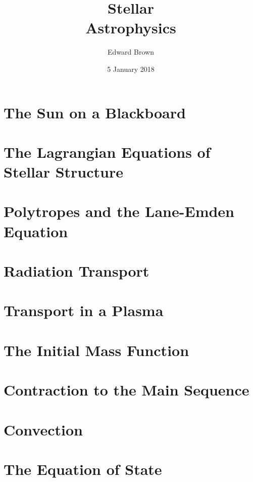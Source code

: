 \documentclass{astro-bookshelf}
\title{Stellar\\Astrophysics}
\author{Edward Brown}
\date{5 January 2018}
\begin{document}
\frontmatter
{}


\mainmatter
{}
\setcounter{page}{1}

\chapter{The Sun on a Blackboard}\label{ch.introduction}


\chapter[Equations of Stellar Structure]{The Lagrangian Equations of Stellar Structure}\label{ch.stellar-structure-eqn}


\chapter[Polytropes]{Polytropes and the Lane-Emden Equation}\label{ch.polytropes}


\chapter{Radiation Transport}


\chapter{Transport in a Plasma}\label{ch.plasma-transport}


\chapter{The Initial Mass Function}\label{ch.IMF}


\chapter{Contraction to the Main Sequence}


\chapter{Convection}\label{s.convection}


\chapter[Equation of State]{The Equation of State}\label{ch.equation-of-state}

\end{document}
